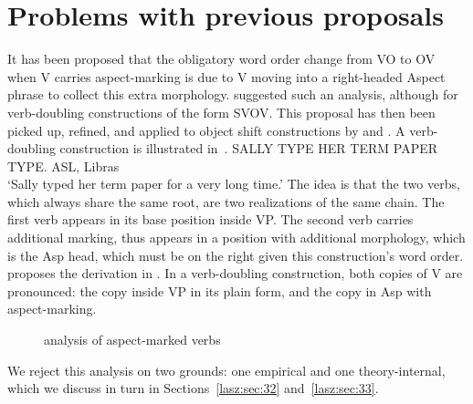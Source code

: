\documentclass[output=paper]{langscibook}
\begin{document}
\section{Problems with previous proposals}
\label{lasz:sec:3}

It has been proposed that the obligatory word order change from VO
to OV when V carries aspect-marking is due to V moving into a
right-headed Aspect phrase to collect this extra morphology. \citet{Fischer.Janis.1992}
suggested such an analysis, although for verb-doubling
constructions of the form SV\laszPlain{}OV\laszAsp{}. This proposal has then
been picked up, refined, and applied to object shift constructions by
\citet{Matsuoka.1997} and \citet{Braze.2004}.
A verb-doubling construction is illustrated in~.
\ea 
    \label{lasz:ex:19}
     {SALLY} {TYPE}\laszPlain{} {HER} {TERM} {PAPER} {TYPE}\laszAsp{}.
     \hfill 
     \cmark ASL, \cmark Libras 
     \\ 
     \glt ‘Sally typed her term paper for a very long time.’
     \citep[from][]{Fischer.Janis.1992}
\z 
The idea is that the two verbs, which always share the same root, are
two realizations of the same chain. The first verb appears in its base
position inside VP. The second verb carries additional marking, thus
appears in a position with additional morphology, which is the Asp
head, which must be on the right given this construction’s word order.
\citet{Matsuoka.1997} proposes the derivation in . In a verb-doubling
construction, both copies of V are pronounced: the copy inside VP in
its plain form, and the copy in Asp with aspect-marking.

\begin{figure}
    \caption{ analysis of aspect-marked verbs}
    \label{lasz:fig:2}
\end{figure}

We reject this analysis on two grounds: one empirical and one
theory-internal, which we discuss in turn in Sections~\ref{lasz:sec:32} and~\ref{lasz:sec:33}.
\end{document}

